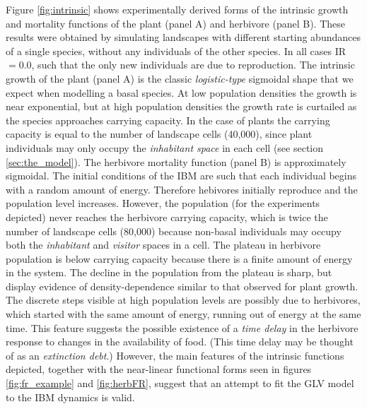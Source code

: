 Figure \ref{fig:intrinsic} shows experimentally derived forms of the intrinsic growth and mortality functions of the plant (panel A) and herbivore (panel B). These results were obtained by simulating landscapes with different starting abundances of a single species, without any individuals of the other species. In all cases IR$=0.0$, such that the only new individuals are due to reproduction. The intrinsic growth of the plant (panel A) is the classic \emph{logistic-type} sigmoidal shape that we expect when modelling a basal species. At low population densities the growth is near exponential, but at high population densities the growth rate is curtailed as the species approaches carrying capacity. In the case of plants the carrying capacity is equal to the number of landscape cells (40,000), since plant individuals may only occupy the \emph{inhabitant space} in each cell (see section \ref{sec:the_model}). The herbivore mortality function (panel B) is approximately sigmoidal. The initial conditions of the IBM are such that each individual begins with a random amount of energy. Therefore hebivores initially reproduce and the population level increases. However, the population (for the experiments depicted) never reaches the herbivore carrying capacity, which is twice the number of landscape cells (80,000) because non-basal individuals may occupy both the \emph{inhabitant} and \emph{visitor} spaces in a cell. The plateau in herbivore population is below carrying capacity because there is a finite amount of energy in the system. The decline in the population from the plateau is sharp, but display evidence of density-dependence similar to that observed for plant growth. The discrete steps visible at high population levels are possibly due to herbivores, which started with the same amount of energy, running out of energy at the same time. This feature suggests the possible existence of a \emph{time delay} in the herbivore response to changes in the availability of food. (This time delay may be thought of as an \emph{extinction debt}.) However, the main features of the intrinsic functions depicted, together with the near-linear functional forms seen in figures \ref{fig:fr_example} and \ref{fig:herbFR}, suggest that an attempt to fit the GLV model to the IBM dynamics is valid. 

%
%
%



